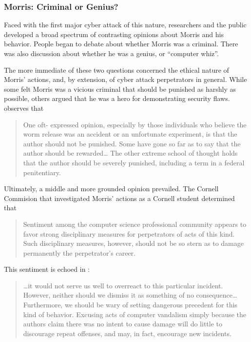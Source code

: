 \subsubsection*{Morris: Criminal or Genius?}
Faced with the first major cyber attack of this nature, researchers and the
public developed a broad spectrum of contrasting opinions about Morris and his
behavior. People began to debate about whether Morris was a criminal.
There was also discussion about whether he was a genius, or ``computer whiz''. 

The more immediate of these two questions concerned the ethical
nature of Morris' actions, and, by extension, of cyber attack perpetrators in
general. While some felt Morris was a vicious criminal that should be
punished as harshly as possible, others argued that he was a hero for
demonstrating security flaws. \cite{spafford_crisis_1989} observes that 
\begin{quote}
One oft- expressed opinion, especially by those individuals who believe the
worm release was an accident or an unfortunate experiment, is that the author
should not be punished. Some have gone so far as to say that the author should
be rewarded\ldots
The other extreme school of thought holds that the author should be severely
punished, including a term in a federal penitentiary.
\end{quote}

Ultimately, a middle and more grounded opinion prevailed. The Cornell Commision
that investigated Morris' actions as a Cornell student determined that 
\begin{quote}
Sentiment among the computer science professional community appears to favor
strong disciplinary measures for perpetrators of acts of this kind. Such
disciplinary measures, however, should not be so stern as to damage permanently
the perpetrator's career.
\end{quote}

This sentiment is echoed in \cite{spafford_crisis_1989}:
\begin{quote}
\ldots it would not serve us well to overreact to this particular incident.
However, neither should we dismiss it as something of no consequence\ldots
Furthermore, we should be wary of setting dangerous precedent for this kind of
behavior. Excusing acts of computer vandalism simply because the authors claim
there was no intent to cause damage will do little to discourage repeat
offenses, and may, in fact, encourage new incidents.
\end{quote}

